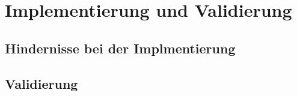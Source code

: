 \chapter{Implementierung und Validierung}

\section{Hindernisse bei der Implmentierung}

\section{Validierung}